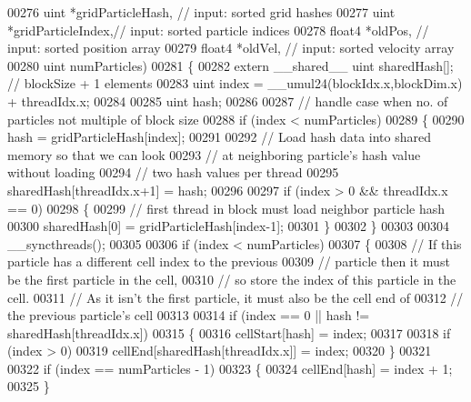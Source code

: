 \begin{DoxyCode}
00276                                   uint   *gridParticleHash, \textcolor{comment}{// input: sorted grid hashes}
00277                                   uint   *gridParticleIndex,\textcolor{comment}{// input: sorted particle indices}
00278                                   float4 *oldPos,           \textcolor{comment}{// input: sorted position array}
00279                                   float4 *oldVel,           \textcolor{comment}{// input: sorted velocity array}
00280                                   uint    numParticles)
00281 \{
00282     \textcolor{keyword}{extern} \_\_shared\_\_ uint sharedHash[];    \textcolor{comment}{// blockSize + 1 elements}
00283     uint index = \_\_umul24(blockIdx.x,blockDim.x) + threadIdx.x;
00284 
00285     uint hash;
00286 
00287     \textcolor{comment}{// handle case when no. of particles not multiple of block size}
00288     \textcolor{keywordflow}{if} (index < numParticles)
00289     \{
00290         hash = gridParticleHash[index];
00291 
00292         \textcolor{comment}{// Load hash data into shared memory so that we can look}
00293         \textcolor{comment}{// at neighboring particle's hash value without loading}
00294         \textcolor{comment}{// two hash values per thread}
00295         sharedHash[threadIdx.x+1] = hash;
00296 
00297         \textcolor{keywordflow}{if} (index > 0 && threadIdx.x == 0)
00298         \{
00299             \textcolor{comment}{// first thread in block must load neighbor particle hash}
00300             sharedHash[0] = gridParticleHash[index-1];
00301         \}
00302     \}
00303 
00304     \_\_syncthreads();
00305 
00306     \textcolor{keywordflow}{if} (index < numParticles)
00307     \{
00308         \textcolor{comment}{// If this particle has a different cell index to the previous}
00309         \textcolor{comment}{// particle then it must be the first particle in the cell,}
00310         \textcolor{comment}{// so store the index of this particle in the cell.}
00311         \textcolor{comment}{// As it isn't the first particle, it must also be the cell end of}
00312         \textcolor{comment}{// the previous particle's cell}
00313 
00314         \textcolor{keywordflow}{if} (index == 0 || hash != sharedHash[threadIdx.x])
00315         \{
00316             cellStart[hash] = index;
00317 
00318             \textcolor{keywordflow}{if} (index > 0)
00319                 cellEnd[sharedHash[threadIdx.x]] = index;
00320         \}
00321 
00322         \textcolor{keywordflow}{if} (index == numParticles - 1)
00323         \{
00324             cellEnd[hash] = index + 1;
00325         \}

\end{DoxyCode}
